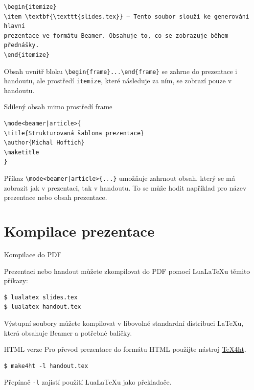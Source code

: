 \begin{verbatim}
\begin{itemize}
\item \textbf{\texttt{slides.tex}} – Tento soubor slouží ke generování hlavní
prezentace ve formátu Beamer. Obsahuje to, co se zobrazuje během přednášky.
\end{itemize}
\end{verbatim}

Obsah uvnitř bloku \verb|\begin|\verb|{frame}...\end|\verb|{frame}| se zahrne
do prezentace i handoutu, ale prostředí \texttt{itemize}, které následuje za
ním, se zobrazí pouze v handoutu.

\begin{frame}[fragile]{Sdílený obsah mimo prostředí frame}

\begin{verbatim}
\mode<beamer|article>{
\title{Strukturovaná šablona prezentace}
\author{Michal Hoftich}
\maketitle
}
\end{verbatim}
\end{frame}

Příkaz \verb+\mode<beamer|article>{...}+ umožňuje zahrnout obsah, který se má
zobrazit jak v prezentaci, tak v handoutu. To se může hodit například pro název
prezentace nebo obsah prezentace.

\section{Kompilace prezentace}

\begin{frame}[fragile]{Kompilace do PDF}

Prezentaci nebo handout můžete zkompilovat do PDF pomocí LuaLaTeXu těmito příkazy:

\begin{verbatim}
$ lualatex slides.tex
$ lualatex handout.tex
\end{verbatim}
\end{frame}



Výstupní soubory můžete kompilovat v libovolné standardní distribuci \LaTeX{}u, která obsahuje Beamer a potřebné balíčky.

\begin{frame}[fragile]{HTML verze}
Pro převod prezentace do formátu HTML použijte nástroj \href{https://www.tug.org/tex4ht/}{\TeX4ht}.
\begin{verbatim}
$ make4ht -l handout.tex\end{verbatim}

Přepínač \verb|-l| zajistí použití Lua\LaTeX{}u jako překladače.
\end{frame}

